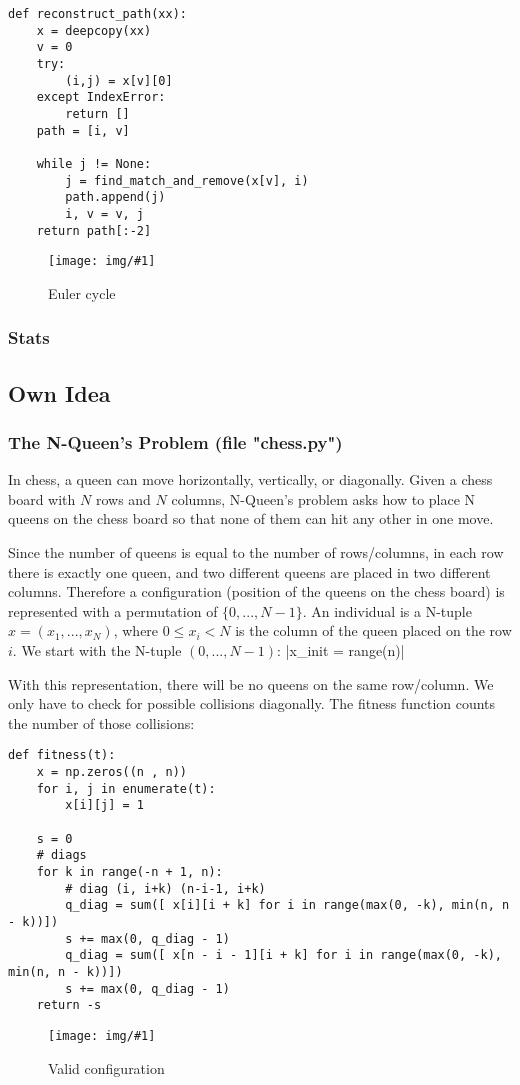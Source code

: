 \documentclass{article}
\newcommand{\IMG}[3]{
\begin{figure}[H]
\centering
\texttt{[image: img/\#1]}%
\caption{#2}%
\label{#1}%
\end{figure}

}
\newcommand{\Stats}{\subsubsection{Stats}}
\begin{document}
\begin{verbatim}
def reconstruct_path(xx):
	x = deepcopy(xx)
	v = 0
	try:
		(i,j) = x[v][0]
	except IndexError:
		return []
	path = [i, v]
	
	while j != None:
		j = find_match_and_remove(x[v], i)
		path.append(j)
		i, v = v, j
	return path[:-2]
\end{verbatim}

\IMG{euler_cycle.png}{Euler cycle}{0.25}

\Stats


\subsection{Own Idea}
\subsubsection{The N-Queen's Problem  (file "chess.py")}
In chess, a queen can move  horizontally, vertically, or diagonally. Given a chess board with $N$ rows and $N$ columns, N-Queen's problem asks how to place N queens on the chess board so that none of them can hit any other in one move.


Since the number of queens is equal to the number of rows/columns, in each row there is exactly one queen, and two different queens are placed in two different columns. Therefore a configuration (position of the queens on the chess board) is represented with a permutation of $\{0, ..., N-1\}$.
An individual is a N-tuple $x = (x_1, ..., x_N)$, where $0 \leq x_i < N$  is the column of the queen placed on the row $i$. We start with the N-tuple $(0, ..., N-1)$: |x_init = range(n)|


With this representation, there will be no queens on the same row/column. We only have to check for possible collisions diagonally. The fitness function counts the number of those collisions: 
\begin{verbatim}
def fitness(t): 
    x = np.zeros((n , n))
    for i, j in enumerate(t):
        x[i][j] = 1
 
    s = 0
    # diags
    for k in range(-n + 1, n):
        # diag (i, i+k) (n-i-1, i+k)
        q_diag = sum([ x[i][i + k] for i in range(max(0, -k), min(n, n - k))])
        s += max(0, q_diag - 1) 
        q_diag = sum([ x[n - i - 1][i + k] for i in range(max(0, -k), min(n, n - k))])
        s += max(0, q_diag - 1)
    return -s 
\end{verbatim}

\IMG{queen.png}{Valid configuration}{0.25}
\end{document}
